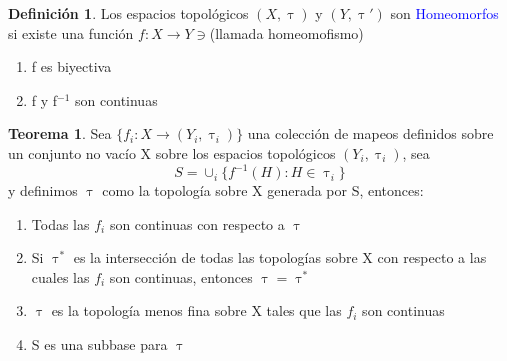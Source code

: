 \documentclass{article}
\theoremstyle{definition}
\newtheorem{definition}{Definición}[section]
\newtheorem{theorem}{Teorema}[section]
\begin{document}
\begin{definition}
	Los espacios topológicos $(X,\uptau)$ y $(Y,\uptau ')$ son \textcolor{blue}{Homeomorfos} si existe una función $f:X\to Y\ni$(llamada homeomofismo)
	\begin{enumerate}
		\item f es biyectiva
		\item f y f$^{-1}$ son continuas
	\end{enumerate}
\end{definition}
\begin{theorem}
	Sea $\{f_i:X\to(Y_i,\uptau_i)\}$ una colección de mapeos definidos sobre un conjunto no vacío X sobre los espacios topológicos $(Y_i,\uptau_i)$, sea 
	\[S=\cup_i \{f^{-1}(H):H\in\uptau_i\}\]
	y definimos $\uptau$ como la topología sobre X generada por S, entonces:
	\begin{enumerate}
	\item Todas las $f_i$ son continuas con respecto a $\uptau$
	\item Si $\uptau^*$ es la intersección de todas las topologías sobre X con respecto a las cuales las $f_i$ son continuas, entonces $\uptau=\uptau^*$
	\item $\uptau$ es la topología menos fina sobre X tales que las $f_i$ son continuas
	\item S es una subbase para $\uptau$
	\end{enumerate}
\end{theorem}
\end{document}
